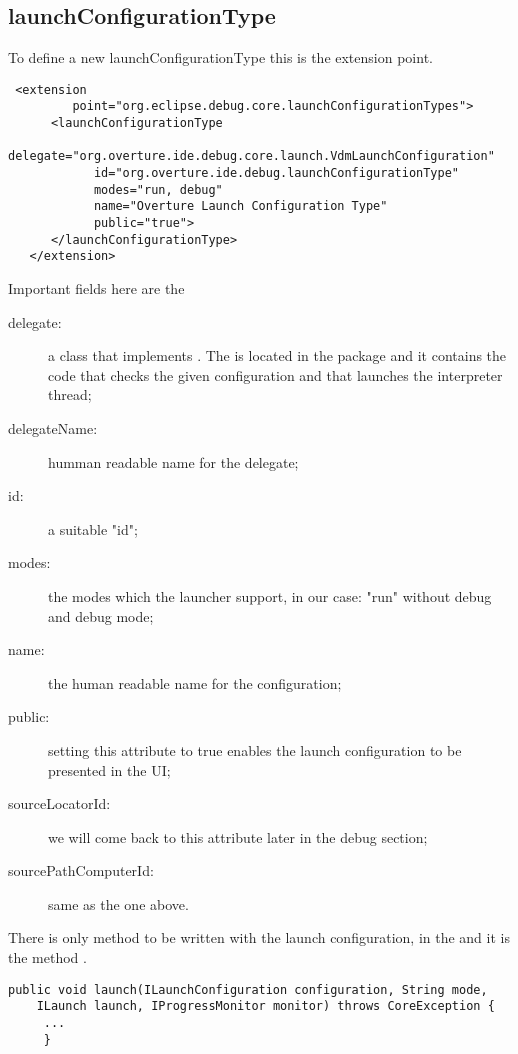 \subsection{launchConfigurationType}
To define a new launchConfigurationType this is the extension point.

\lstset{language=XML, caption=lauchConfigurationTypes extension point}
\begin{lstlisting}
 <extension
         point="org.eclipse.debug.core.launchConfigurationTypes">
      <launchConfigurationType
            delegate="org.overture.ide.debug.core.launch.VdmLaunchConfiguration"
            id="org.overture.ide.debug.launchConfigurationType"
            modes="run, debug"
            name="Overture Launch Configuration Type"
            public="true">
      </launchConfigurationType>
   </extension>
\end{lstlisting}

Important fields here are the
\begin{description}


\item[delegate:] a class that implements . The  is located in the package  and it contains the code that checks the given configuration and that launches the interpreter thread;

\item[delegateName:] humman readable name for the delegate;

\item[id:] a suitable "id";

\item[modes:] the modes which the launcher support, in our case: "run" without debug and debug mode;

\item[name:] the human readable name for the configuration;

\item[public:] setting this attribute to true enables the launch configuration to be presented in the UI;

\item[sourceLocatorId:] we will come back to this attribute later in the debug section;

\item[sourcePathComputerId:] same as the one above.
\end{description}

There is only method to be written with the launch configuration, in the  and it is the  method .
\begin{lstlisting}
public void launch(ILaunchConfiguration configuration, String mode,
    ILaunch launch, IProgressMonitor monitor) throws CoreException {
	 ...
	 }
\end{lstlisting}

